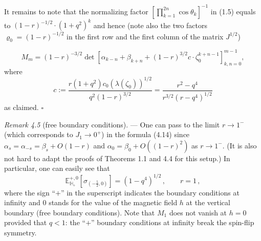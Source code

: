 \documentclass[11pt]{article}
\theoremstyle{plain}
\newcommand{\E}{\mathbb{E}}
\newcommand{\Hb}{\mathbb{H}}
\newcommand{\diamondH}{\Hb_{\diamond}}
\begin{document}

It remains to note that the normalizing factor $\left[\prod_{k=1}^{2n}\cos\theta_k\right]^{-1}$ in (1.5) equals
to $(1-r)^{-1/2}\cdot(1+q^2)^k$ and hence (note also the two factors $\varrho_0 = (1-r)^{-1/2}$ in the first row
and the first column of the matrix $J^{1/2}$)


\[
M_m = (1-r)^{-3/2}\det\left[\alpha_{k-n} + \beta_{k+n} + (1-r)^{3/2}c\cdot\zeta_0^{k+n-1}\right]_{k,n=0}^{m-1},
\]
where
\[
c := \frac{r(1+q^2)c_0(\lambda(\zeta_0))^{1/2}}{q^2(1-r)^{3/2}} = \frac{r^2-q^4}{r^{3/2}(r-q^4)^{1/2}}
\]
as claimed. \hfill$\square$


\medskip
\noindent\emph{Remark 4.5} (free boundary conditions). --- One can pass to the limit $r \to 1^-$ (which
corresponds to $J_1 \to 0^+$) in the formula (4.14) since $\alpha_s = \alpha_{-s} = \beta_s + O(1-r)$ and
$\alpha_0 = \beta_0 + O((1-r)^2)$ as $r \to 1^-$. (It is also not hard to adapt the proofs of Theorems 1.1 and
4.4 for this setup.) In particular, one can easily see that
\[
\E^{+,0}_{\diamondH}\left[\sigma_{\left(-\frac{5}{2},0\right)}\right] = (1-q^4)^{1/2} \,, \qquad r = 1 \,,
\]
where the sign ``$+$'' in the superscript indicates the boundary conditions at infinity and $0$ stands for the
value of the magnetic field $h$ at the vertical boundary (free boundary conditions). Note that $M_1$ does not
vanish at $h = 0$ provided that $q < 1$: the ``$+$'' boundary conditions at infinity break the spin-flip
symmetry.
\end{document}
